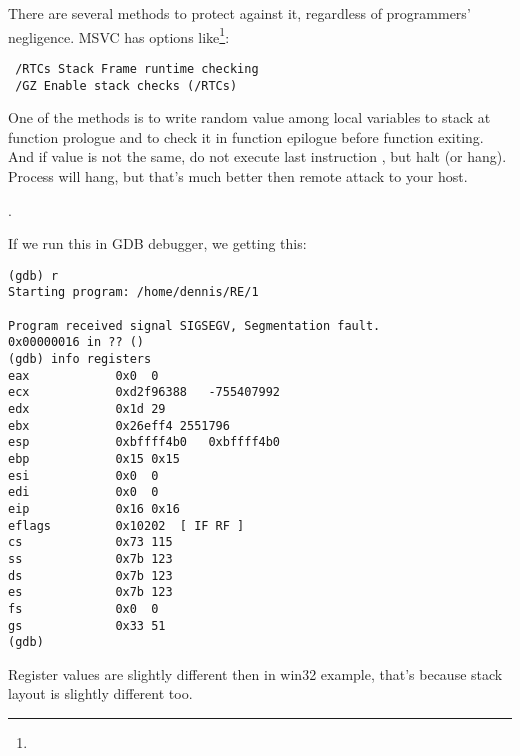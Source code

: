 {There are several methods to protect against it, regardless of \CCpp programmers' negligence.
MSVC has options like\footnote{\URLWPB}:}

\begin{verbatim}
 /RTCs Stack Frame runtime checking
 /GZ Enable stack checks (/RTCs)
\end{verbatim}

{One of the methods is to write random value among local variables to stack at function prologue 
and to check it in function epilogue before function exiting.
And if value is not the same, do not execute last instruction \RET, but halt (or hang).
Process will hang, but that's much better then remote attack to your host.}




 .

{If we run this in GDB debugger, we getting this:}

\begin{lstlisting}
(gdb) r
Starting program: /home/dennis/RE/1 

Program received signal SIGSEGV, Segmentation fault.
0x00000016 in ?? ()
(gdb) info registers
eax            0x0	0
ecx            0xd2f96388	-755407992
edx            0x1d	29
ebx            0x26eff4	2551796
esp            0xbffff4b0	0xbffff4b0
ebp            0x15	0x15
esi            0x0	0
edi            0x0	0
eip            0x16	0x16
eflags         0x10202	[ IF RF ]
cs             0x73	115
ss             0x7b	123
ds             0x7b	123
es             0x7b	123
fs             0x0	0
gs             0x33	51
(gdb) 
\end{lstlisting}

{Register values are slightly different then in win32 example, 
that's because stack layout is slightly different too.}
